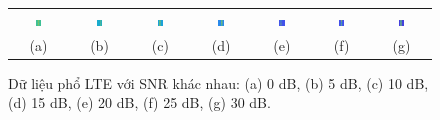 \begin{figure}[!h]
    \centering
    \footnotesize
    \begin{tabular}{ccccccc}
        \includegraphics[width=0.12\textwidth]{fig/LTE_frame_0db.png} & \includegraphics[width=0.12\textwidth]{fig/LTE_frame_5db.png} &
        \includegraphics[width=0.12\textwidth]{fig/LTE_frame_10db.png} &
        \includegraphics[width=0.12\textwidth]{fig/LTE_frame_15db.png} & \includegraphics[width=0.12\textwidth]{fig/LTE_frame_20db.png} &
        \includegraphics[width=0.12\textwidth]{fig/LTE_frame_25db.png} &
        \includegraphics[width=0.12\textwidth]{fig/LTE_frame_30db.png}
        \\
        (a) & (b) & (c) & (d) & (e) & (f) & (g)
    \end{tabular}
    \caption{Dữ liệu phổ LTE với SNR khác nhau: (a) 0 dB, (b) 5 dB, (c) 10 dB, (d) 15 dB, (e) 20 dB, (f) 25 dB, (g) 30 dB.}
    \label{fig_datasetLTE}
\end{figure}

